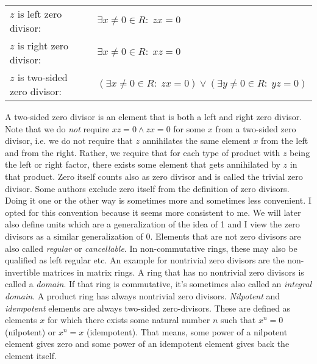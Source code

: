 \medskip
\begin{tabular}{l l}
$z$ is left zero divisor:       & $\exists x \neq 0 \in R: \; z x = 0$  \\
$z$ is right zero divisor:      & $\exists x \neq 0 \in R: \; x z = 0$  \\
$z$ is two-sided zero divisor:  & $(\exists x \neq 0 \in R: \; z x = 0) 
                              \vee (\exists y \neq 0 \in R: \; y z = 0)$  \\
\end{tabular}
\medskip

A two-sided zero divisor is an element that is both a left and right zero divisor. Note that we do \emph{not} require $x z = 0 \wedge z x = 0$ for some $x$ from a two-sided zero divisor, i.e. we do not require that $z$ annihilates the same element $x$ from the left and from the right. Rather, we require that for each type of product with $z$ being the left or right factor, there exists some element that gets annihilated by $z$ in that product. Zero itself counts also as zero divisor and is called the trivial zero divisor. Some authors exclude zero itself from the definition of zero divisors. Doing it one or the other way is sometimes more and sometimes less convenient. I opted for this convention because it seems more consistent to me. We will later also define units which are a generalization of the idea of 1 and I view the zero divisors as a similar generalization of 0. Elements that are not zero divisors are also called \emph{regular} or \emph{cancellable}. In non-commutative rings, these may also be qualified as left regular etc. An example for nontrivial zero divisors are the non-invertible matrices in matrix rings. A ring that has no nontrivial zero divisors is called a \emph{domain}. If that ring is commutative, it's sometimes also called an \emph{integral domain}. A product ring has always nontrivial zero divisors. \emph{Nilpotent} and \emph{idempotent} elements are always two-sided zero-divisors. These are defined as elements $x$ for which there exists some natural number $n$ such that $x^n = 0$ (nilpotent) or $x^n = x$ (idempotent). That means, some power of a nilpotent element gives zero and some power of an idempotent element gives back the element itself.



